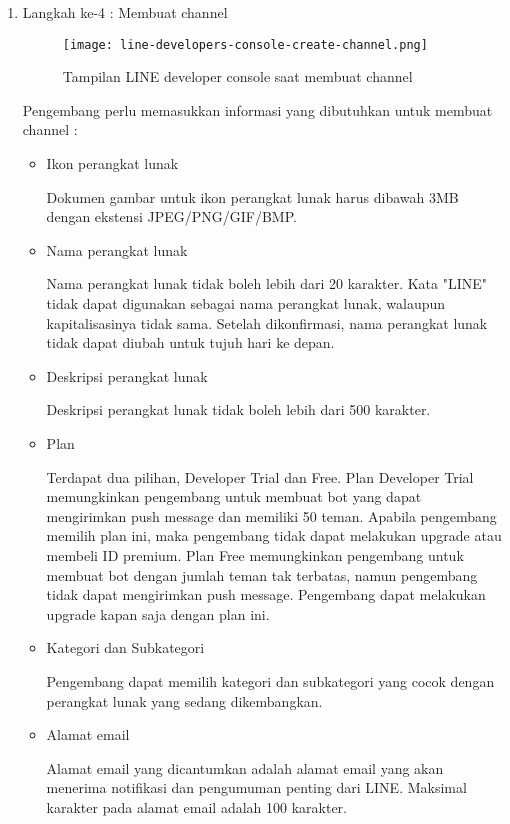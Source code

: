 \begin{enumerate}
\item Langkah ke-4 : Membuat channel
\begin{figure}[H]
	\centering  
	\texttt{[image: line-developers-console-create-channel.png]}  
	\caption[Tampilan LINE developer console saat membuat channel]{Tampilan LINE developer console saat membuat channel} 
	\label{fig:line-developers-console-create-channel} 
\end{figure}

Pengembang perlu memasukkan informasi yang dibutuhkan untuk membuat channel :
\begin{itemize}
\item Ikon perangkat lunak

Dokumen gambar untuk ikon perangkat lunak harus dibawah 3MB dengan ekstensi JPEG/PNG/GIF/BMP.

\item Nama perangkat lunak

Nama perangkat lunak tidak boleh lebih dari 20 karakter. Kata "LINE" tidak dapat digunakan sebagai nama perangkat lunak, walaupun kapitalisasinya tidak sama. Setelah dikonfirmasi, nama perangkat lunak tidak dapat diubah untuk tujuh hari ke depan.

\item Deskripsi perangkat lunak

Deskripsi perangkat lunak tidak boleh lebih dari 500 karakter.

\item Plan

Terdapat dua pilihan, Developer Trial dan Free. Plan Developer Trial memungkinkan pengembang untuk membuat bot yang dapat mengirimkan push message dan memiliki 50 teman. Apabila pengembang memilih plan ini, maka pengembang tidak dapat melakukan upgrade atau membeli ID premium. Plan Free memungkinkan pengembang untuk membuat bot dengan jumlah teman tak terbatas, namun pengembang tidak dapat mengirimkan push message. Pengembang dapat melakukan upgrade kapan saja dengan plan ini.

\item Kategori dan Subkategori

Pengembang dapat memilih kategori dan subkategori yang cocok dengan perangkat lunak yang sedang dikembangkan.

\item Alamat email

Alamat email yang dicantumkan adalah alamat email yang akan menerima notifikasi dan pengumuman penting dari LINE. Maksimal karakter pada alamat email adalah 100 karakter.


\end{itemize}
\end{enumerate}
